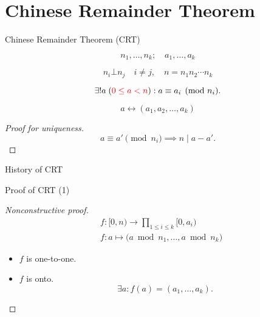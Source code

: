 \section{Chinese Remainder Theorem}

\begin{frame}{Chinese Remainder Theorem (CRT)}
  \begin{theorem}[CRT]
	\[
	  n_1, \ldots, n_k; \quad a_1, \ldots, a_k
	\]

	\[ 
	  n_i \bot n_j \quad i \neq j, \quad n = n_1n_2\cdots n_k 
	\]

    \[
	  \exists! a\; (\textcolor{red}{0 \le a < n}): a \equiv a_i \pmod{n_i}.
	\]
  \end{theorem}

  \pause
  \[
	a \leftrightarrow (a_1, a_2, \ldots, a_k)
  \]

  \pause
  \begin{proof}[Proof for uniqueness]
	\[
	  a \equiv a' \pmod{n_i} \implies n \mid a - a'.
	\]
  \end{proof}
\end{frame}
\begin{frame}{History of CRT}
  \begin{quote}
  \end{quote}
\end{frame}
\begin{frame}{Proof of CRT (1)}
  \begin{proof}[Nonconstructive proof]
	\begin{align*}
	  &f: [0,n) \to \prod_{1 \le i \le k} [0,a_i) \\
	  &f: a \mapsto \big( a \bmod n_1, \dots, a \bmod n_k \big)
	\end{align*}

	\pause

	\begin{itemize}[<+->]
	  \item $f$ is one-to-one.
	  \item $f$ is onto.
		\[
		  \exists a: f(a) = (a_1, \dots, a_k).
		\]
	\end{itemize}
  \end{proof}
\end{frame}
